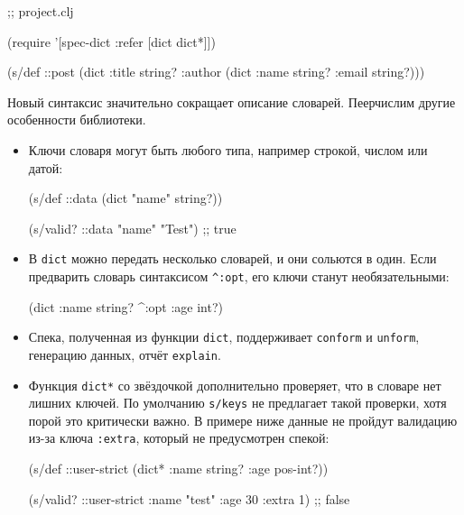 \begin{english}
  \begin{clojure}
 ;; project.clj

(require '[spec-dict :refer [dict dict*]])

(s/def ::post
  (dict {:title string?
         :author (dict {:name string?
                        :email string?})}))
  \end{clojure}
\end{english}

Новый синтаксис значительно сокращает описание словарей. Пеерчислим другие
особенности библиотеки.

\begin{itemize}

\item
  Ключи словаря могут быть любого типа, например строкой, числом или датой:

\begin{english}
  \begin{clojure}
(s/def ::data (dict {"name" string?}))

(s/valid? ::data {"name" "Test"})
;; true
  \end{clojure}
\end{english}

\item
  В \verb|dict| можно передать несколько словарей, и они сольются в один. Если
  предварить словарь синтаксисом \verb|^:opt|, его ключи станут необязательными:

\begin{english}
  \begin{clojure}
(dict {:name string?} ^:opt {:age int?})
  \end{clojure}
\end{english}

\item
  Спека, полученная из функции \verb|dict|, поддерживает \verb|conform| и \verb|unform|,
  генерацию данных, отчёт \verb|explain|.

\item
  Функция \verb|dict*| со звёздочкой дополнительно проверяет, что в словаре нет
  лишних ключей. По умолчанию \verb|s/keys| не предлагает такой проверки, хотя
  порой это критически важно. В примере ниже данные не пройдут валидацию из-за
  ключа \verb|:extra|, который не предусмотрен спекой:

\begin{english}
  \begin{clojure}
(s/def ::user-strict
  (dict* {:name string? :age pos-int?}))

(s/valid? ::user-strict
          {:name "test" :age 30 :extra 1})
;; false
  \end{clojure}
\end{english}

\end{itemize}

